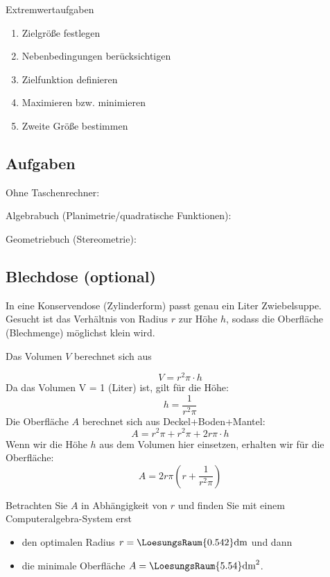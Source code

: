   
\begin{rezept}{Extremwertaufgaben}{}
    \begin{enumerate}
    \item Zielgröße festlegen
    \item Nebenbedingungen berücksichtigen
    \item Zielfunktion definieren
    \item Maximieren bzw. minimieren
    \item Zweite Größe bestimmen
      \end{enumerate}
\end{rezept}
  

\subsection*{Aufgaben}
Ohne Taschenrechner:

Algebrabuch (Planimetrie/quadratische Funktionen):


Geometriebuch (Stereometrie):

\newpage


\subsection{Blechdose (optional)}
In eine Konservendose (Zylinderform) passt genau ein Liter Zwiebelsuppe. Gesucht ist das Verhältnis von Radius $r$ zur Höhe $h$, sodass die Oberfläche (Blechmenge) möglichst klein wird.

Das Volumen $V$ berechnet sich aus

$$V = r^2\pi\cdot{}h$$
Da das Volumen V = 1 (Liter) ist, gilt für die Höhe:
$$h = \frac{1}{r^2\pi}$$
Die Oberfläche $A$ berechnet sich aus Deckel+Boden+Mantel:  
$$A=r^2\pi + r^2\pi + 2r\pi\cdot{}h$$
Wenn wir die Höhe $h$ aus dem Volumen hier einsetzen, erhalten wir für die Oberfläche:
$$A=2r\pi\left(r+\frac{1}{r^2\pi}\right)$$

Betrachten Sie $A$ in Abhängigkeit von $r$ und finden Sie mit einem
Computeralgebra-System erst
\begin{itemize}
\item
  den optimalen Radius $r=\LoesungsRaum{0.542}\textrm{dm}$ und dann
\item
  die minimale Oberfläche $A= \LoesungsRaum{5.54}\textrm{dm}^2$.
\end{itemize}
\newpage

